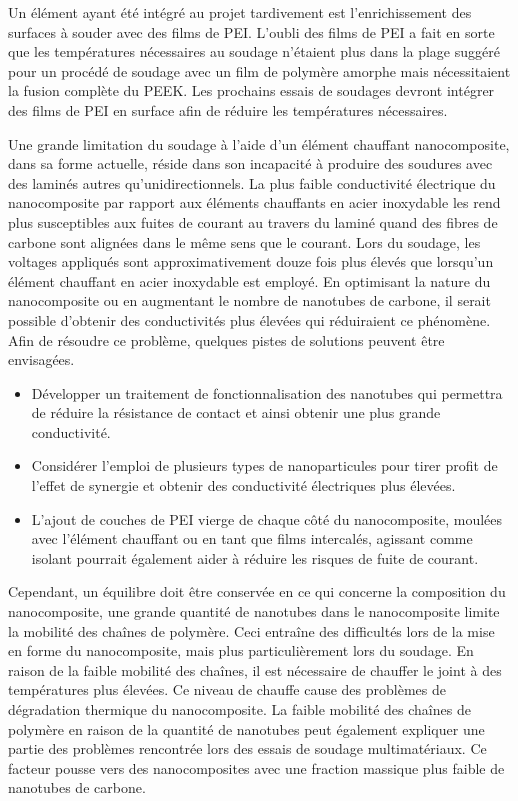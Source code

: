 Un élément ayant été intégré au projet tardivement est l'enrichissement des surfaces à souder avec des films de PEI. 
L'oubli des films de PEI a fait en sorte que les températures nécessaires au soudage n'étaient plus dans la plage suggéré pour un procédé de soudage avec un film de polymère amorphe mais nécessitaient la fusion complète du PEEK. 
Les prochains essais de soudages devront intégrer des films de PEI en surface afin de réduire les températures nécessaires.  

Une grande limitation du soudage à l'aide d'un élément chauffant nanocomposite, dans sa forme actuelle, réside dans son incapacité à produire des soudures avec des laminés autres qu'unidirectionnels. 
La plus faible conductivité électrique du nanocomposite par rapport aux éléments chauffants en acier inoxydable les rend plus susceptibles aux fuites de courant au travers du laminé quand des fibres de carbone sont alignées dans le même sens que le courant. 
Lors du soudage, les voltages appliqués sont approximativement douze fois plus élevés que lorsqu'un élément chauffant en acier inoxydable est employé. 
En optimisant la nature du nanocomposite ou en augmentant le nombre de nanotubes de carbone, il serait possible d'obtenir des conductivités plus élevées qui réduiraient ce phénomène. 
Afin de résoudre ce problème, quelques pistes de solutions peuvent être envisagées. 

\begin{itemize}
	\item Développer un traitement de fonctionnalisation des nanotubes qui permettra de réduire la résistance de contact et ainsi obtenir une plus grande conductivité.  
	\item Considérer l'emploi de plusieurs types de nanoparticules pour tirer profit de l'effet de synergie et obtenir des conductivité électriques plus élevées. 
	\item L'ajout de couches de PEI vierge de chaque côté du nanocomposite, moulées avec l'élément chauffant ou en tant que films intercalés, agissant comme isolant pourrait également aider à réduire les risques de fuite de courant. 
\end{itemize}

Cependant, un équilibre doit être conservée en ce qui concerne la composition du nanocomposite, une grande quantité de nanotubes dans le nanocomposite limite la mobilité des chaînes de polymère. 
Ceci entraîne des difficultés lors de la mise en forme du nanocomposite, mais plus particulièrement lors du soudage.
En raison de la faible mobilité des chaînes, il est nécessaire de chauffer le joint à des températures plus élevées. 
Ce niveau de chauffe cause des problèmes de dégradation thermique du nanocomposite. 
La faible mobilité des chaînes de polymère en raison de la quantité de nanotubes peut également expliquer une partie des problèmes rencontrée lors des essais de soudage multimatériaux. 
Ce facteur pousse vers des nanocomposites avec une fraction massique plus faible de nanotubes de carbone. 

